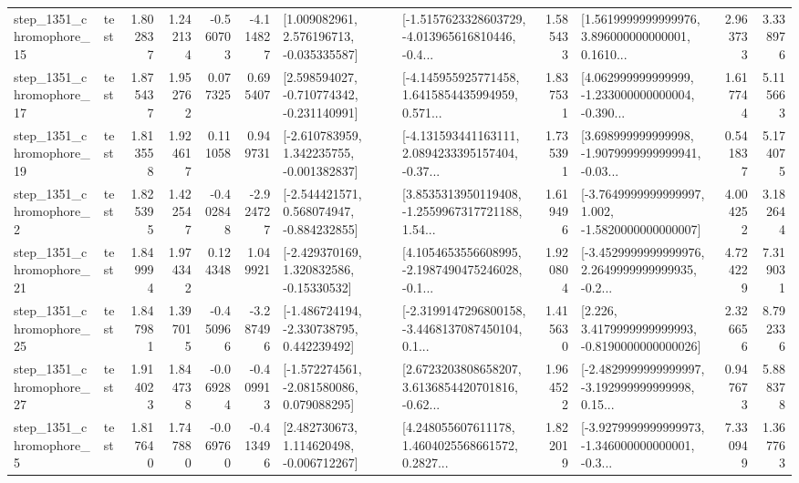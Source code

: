 \begin{tabular}{llrrrrllrlrr}
 step\_1351\_chromophore\_15 &      test &      1.802837 &    1.242134 &     -0.560703 & -4.114827 &    [1.009082961, 2.576196713, -0.035335587] &  [-1.5157623328603729, -4.013965616810446, -0.4... &       1.585433 &  [1.5619999999999976, 3.896000000000001, 0.1610... &            2.963733 &          3.338976 \\
 step\_1351\_chromophore\_17 &      test &      1.875437 &    1.952762 &      0.077325 &  0.695407 &   [2.598594027, -0.710774342, -0.231140991] &  [-4.145955925771458, 1.6415854435994959, 0.571... &       1.837531 &  [4.062999999999999, -1.233000000000004, -0.390... &            1.617744 &          5.115663 \\
 step\_1351\_chromophore\_19 &      test &      1.813558 &    1.924617 &      0.111058 &  0.949731 &   [-2.610783959, 1.342235755, -0.001382837] &  [-4.131593441163111, 2.0894233395157404, -0.37... &       1.735391 &  [3.698999999999998, -1.9079999999999941, -0.03... &            0.541837 &          5.174075 \\
  step\_1351\_chromophore\_2 &      test &      1.825395 &    1.422547 &     -0.402848 & -2.924727 &   [-2.544421571, 0.568074947, -0.884232855] &  [3.8535313950119408, -1.2559967317721188, 1.54... &       1.619496 &  [-3.7649999999999997, 1.002, -1.5820000000000007] &            4.004252 &          3.182644 \\
 step\_1351\_chromophore\_21 &      test &      1.849994 &    1.974342 &      0.124348 &  1.049921 &    [-2.429370169, 1.320832586, -0.15330532] &  [4.1054653556608995, -2.1987490475246028, -0.1... &       1.920804 &  [-3.4529999999999976, 2.2649999999999935, -0.2... &            4.724229 &          7.319031 \\
 step\_1351\_chromophore\_25 &      test &      1.847981 &    1.397015 &     -0.450966 & -3.287496 &   [-1.486724194, -2.330738795, 0.442239492] &  [-2.3199147296800158, -3.4468137087450104, 0.1... &       1.415630 &   [2.226, 3.4179999999999993, -0.8190000000000026] &            2.326656 &          8.792336 \\
 step\_1351\_chromophore\_27 &      test &      1.914023 &    1.844738 &     -0.069284 & -0.409913 &   [-1.572274561, -2.081580086, 0.079088295] &  [2.6723203808658207, 3.6136854420701816, -0.62... &       1.964522 &  [-2.4829999999999997, -3.192999999999998, 0.15... &            0.947673 &          5.888378 \\
  step\_1351\_chromophore\_5 &      test &      1.817640 &    1.747880 &     -0.069760 & -0.413496 &    [2.482730673, 1.114620498, -0.006712267] &  [4.248055607611178, 1.4604025568661572, 0.2827... &       1.822019 &  [-3.9279999999999973, -1.346000000000001, -0.3... &            7.330949 &          1.367763 \\

\end{tabular}
